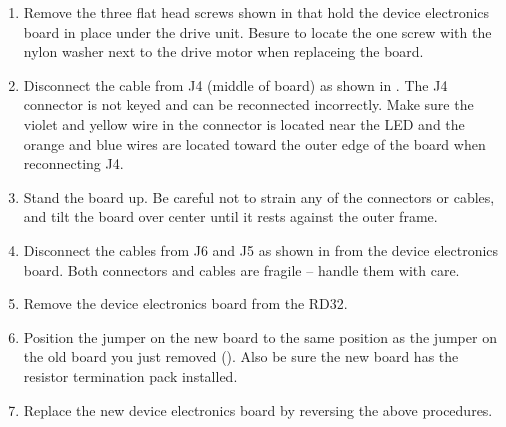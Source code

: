 
\begin{enumerate}
\item	Remove the three flat head screws shown in  that hold the
		device electronics board in place under the drive unit. Besure to locate
		the one screw with the nylon washer next to the drive motor when
		replaceing the board.

\newpage
\item	Disconnect the cable from J4 (middle of board) as shown in .
		The J4 connector is not keyed and can be reconnected incorrectly. Make
		sure the violet and yellow wire in the connector is located near the LED
		and the orange and blue wires are located toward the outer edge of the
		board when reconnecting J4.

\item	Stand the board up. Be careful not to strain any of the connectors or
		cables, and tilt the board over center until it rests against the outer
		frame.

\newpage
\item	Disconnect the cables from J6 and J5 as shown in  from
		the device electronics board. Both connectors and cables are fragile --
		handle them with care.


\item	Remove the device electronics board from the RD32.
\newpage

\item	Position the jumper on the new board to the same position as the jumper
		on the old board you just removed (). Also be sure the new
		board has the resistor termination pack installed.


\item	Replace the new device electronics board by reversing the above procedures.
\end{enumerate}
\newpage
